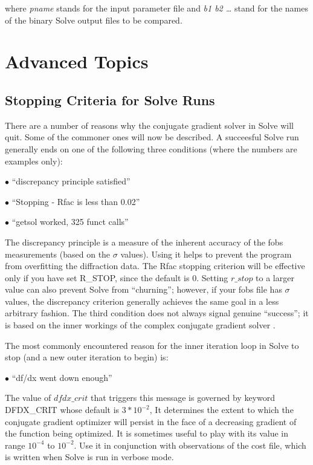 \documentclass{report}
\begin{document}
{

where {\it pname} stands for the input parameter file and 
{\it b1 b2 \dots} stand for the names of the binary Solve output files 
to be compared.


\chapter {Advanced Topics} 
\label{advanced}

\section {Stopping Criteria for Solve Runs}
\label{advanced-stop}

There are a number of reasons why the conjugate gradient solver in Solve
will quit. Some of the commoner ones will now be described.
A succeesful Solve run generally ends on one of the following three conditions
(where the numbers are examples only):

$\bullet$ ``discrepancy principle satisfied''

$\bullet$ ``Stopping - Rfac is less than 0.02''

$\bullet$ ``getsol worked, 325 funct calls'' 

The discrepancy principle is a measure of the inherent accuracy of the fobs
measurements (based on the $\sigma$ values).  
Using it helps to prevent the program
from overfitting the diffraction data.
The Rfac stopping criterion will be effective only if you have set
R\_STOP, since the default is 0.
Setting $r\_stop$ to a larger value can also prevent 
Solve from ``churning''; however, if your fobs file 
has $\sigma$ values, the discrepancy criterion 
generally achieves the same goal in a less arbitrary fashion.
The third condition does not always signal genuine ``success''; 
it is based on the inner
workings of the complex conjugate gradient solver \cite{gill}.

\vspace {0.1in}

The most commonly encountered reason for the inner iteration loop in Solve to stop 
(and a new outer iteration to begin) is:

$\bullet$ ``df/dx went down enough''

The value of $dfdx\_crit$ that triggers this message is governed by
keyword DFDX\_CRIT whose default is $3 * 10^{-2}$,
It determines the extent to which the conjugate gradient optimizer will persist 
in the face of a decreasing gradient of the function being optimized.
It is sometimes useful to play with its value in range $10^{-4}$ to $10^{-2}$.
Use  it in conjunction with observations of the cost file, which is written
when Solve is run in verbose mode.

}
\end{document}
